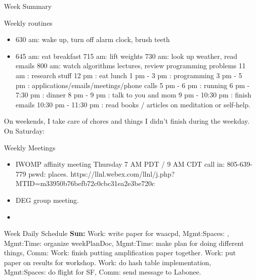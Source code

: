 \documentclass[serif, mathserif, final]{beamer}
\begin{document}
\begin{frame}
\begin{columns}
\begin{column}{0.5\linewidth}
\begin{block}{Week Summary}
\begin{block}{Weekly routines} 
\begin{itemize}
\tiny \item \tiny 630 am: wake up, turn off alarm clock, brush teeth
\item \tiny 645 am: eat breakfast
715 am: lift weights
730 am: look up weather, read emails
800 am: watch algorithms lectures, review programming problems
11 am : research stuff
12 pm : eat lunch
1 pm - 3 pm : programming
3 pm - 5 pm : applications/emails/meetings/phone calls
5 pm  - 6 pm : running
6 pm  - 7:30 pm : dinner
8 pm - 9 pm : talk to you and mom
9 pm - 10:30 pm : finish emails
10:30 pm - 11:30 pm : read books / articles on meditation or self-help.
\end{itemize} 

On weekends, I take care of chores and things I didn't finish during
the weekday. 
On Saturday: 

\end{block} 

\begin{block}{Weekly Meetings}
  \begin{itemize} 
  \item \tiny IWOMP affinity meeting Thursday 7 AM PDT / 9 AM
    CDT call in: 805-639-779 pswd: places. 
    https://llnl.webex.com/llnl/j.php?MTID=m33950b76befb72c0cbc31ea2e3be720c  
  \item \tiny DEG group meeting. 
  \item \tiny 
  \end{itemize}
\end{block} 


\begin{block}{Week Daily Schedule} 
  {\bf Sun:} Work: write paper for waacpd, Mgmt:Spaces: , Mgmt:Time:
  organize weekPlanDoc, Mgmt:Time: make plan for doing different
  things, Comm: 
     Work: finish putting amplification paper
    together. Work: put paper on results for workshop. Work: do hash
    table implementation, Mgmt:Spaces: do flight for SF, Comm: send message to Labonee. 
\end{block} 


\end{block}
\end{column}
\end{columns}
\end{frame}
\end{document}
